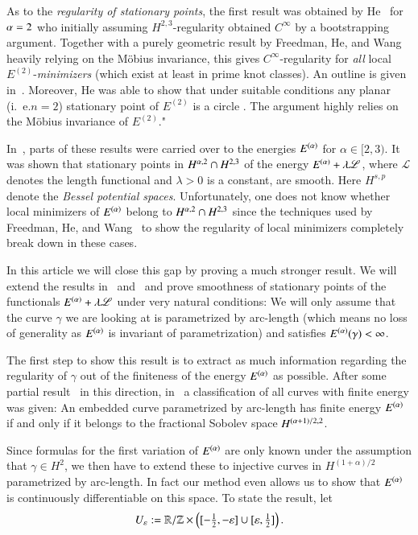 As to the \emph{regularity of stationary points}, the first result was obtained by He~\cite{he:elghf} for $\alpha=2$
who initially assuming $H^{2,3}$-regularity obtained $C^\infty$ by a bootstrapping argument.
Together with a purely geometric result by Freedman, He, and Wang~\cite{fhw} heavily relying on the M\"obius invariance, this gives
$C^\infty$-regularity for \emph{all} local $E^{(2)}$-\emph{minimizers} (which exist at least in prime knot classes).
An outline is given in~\cite{reiter:rtm}.
Moreover, He was able to show that under suitable conditions any
planar (i.~e.\@ $n=2$) stationary point of $E^{(2)}$ is a circle
\cite[Thm.~6.3]{he:elghf}. The argument highly relies on the M\"obius
invariance of $E^{(2)}$."

In~\cite{reiter:rkepdc}, parts of these results were carried over to the energies $E^{(\alpha)}$ for $\alpha \in [2,3)$.
It was shown that stationary points in $H^{\alpha,2}\cap H^{2,3}$ 
of the energy $E^{(\alpha)} + \lambda \mathscr L$, where $\mathscr L$ denotes the length functional and $\lambda>0$ is
a constant, are smooth. Here $H^{s,p}$ denote the \emph{Bessel potential spaces}.
Unfortunately, one does not know whether local minimizers
of $E^{(\alpha)}$ belong to $H^{\alpha,2}\cap H^{2,3}$ since the techniques used 
by Freedman, He, and Wang~\cite{fhw} to show the 
regularity of local minimizers completely break down in these cases.

In this article we will close this gap by proving a much stronger
result. We will extend the results in~\cite{reiter:rkepdc} and~\cite{oha:en-func}
and prove smoothness of stationary points of the 
functionals $E^{(\alpha)} + \lambda\mathscr L$ under very natural conditions: We 
will only assume that the curve $\gamma$ we are looking at is parametrized by arc-length
(which means no loss of generality as $E^{(\alpha)}$ is invariant of parametrization)
and satisfies $E^{(\alpha)}(\gamma)<\infty$.

The first step to show this result is to extract as much information regarding the regularity of
$\gamma$ out of the finiteness
of the energy $E^{(\alpha)}$ as possible.
After some partial result~\cite{blatt-reiter} in this
direction, in~\cite{blatt:bre} a classification of all curves with finite energy was given:
An embedded curve parametrized by arc-length
has finite energy $E^{(\alpha)}$ if and only if it belongs to the fractional Sobolev space $H^{\scriptstyle (\alpha+1)/2,2}$.

Since formulas for the first variation of $E^{(\alpha)}$ are only known 
under the assumption that $\gamma \in H^2$, we then have to extend these
to injective curves in $H^{(1+\alpha)/2}$ parametrized by arc-length. In fact our 
method even allows us to show that $E^{(\alpha)}$ is continuously differentiable on this space.
To state the result,
let
\begin{equation*}%
 \textstyle U_\eps := \R/\Z \times \br{[-\frac12,-\eps]\cup[\eps,\frac12]}.
\end{equation*}

